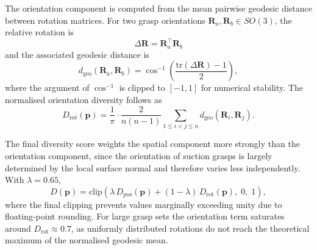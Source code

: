 \begin{enumerate}
The orientation component is computed from the mean pairwise geodesic distance between
rotation matrices. For two grasp orientations
$\mathbf{R}_a, \mathbf{R}_b \in SO(3)$, the relative rotation is
\begin{equation}
    \Delta \mathbf{R} = \mathbf{R}_a^\top \mathbf{R}_b
\end{equation}
and the associated geodesic distance is
\begin{equation}
    d_{\mathrm{geo}}(\mathbf{R}_a,\mathbf{R}_b)
    = \cos^{-1}\!\left(
        \frac{\mathrm{tr}(\Delta \mathbf{R}) - 1}{2}
    \right),
\end{equation}
where the argument of $\cos^{-1}$ is clipped to $[-1,1]$ for numerical stability. The
normalised orientation diversity follows as
\begin{equation}
    D_{\mathrm{rot}}(\mathbf{p}) =
    \frac{1}{\pi} \cdot
    \frac{2}{n(n-1)}
    \sum_{1 \leq i < j \leq n}
    d_{\mathrm{geo}}(\mathbf{R}_i,\mathbf{R}_j).
\end{equation}

The final diversity score weights the spatial component more strongly than the orientation
component, since the orientation of suction grasps is largely determined by the local
surface normal and therefore varies less independently. With $\lambda = 0.65$,
\begin{equation}
    D(\mathbf{p}) =
    \mathrm{clip}\!\left(
        \lambda\, D_{\mathrm{pos}}(\mathbf{p}) +
        (1-\lambda)\, D_{\mathrm{rot}}(\mathbf{p}),
        \; 0, \; 1
    \right),
\end{equation}
where the final clipping prevents values marginally exceeding unity due to floating-point
rounding. For large grasp sets the orientation term saturates around
$D_{\mathrm{rot}} \approx 0.7$, as uniformly distributed rotations do not reach the
theoretical maximum of the normalised geodesic mean.


\end{enumerate}
